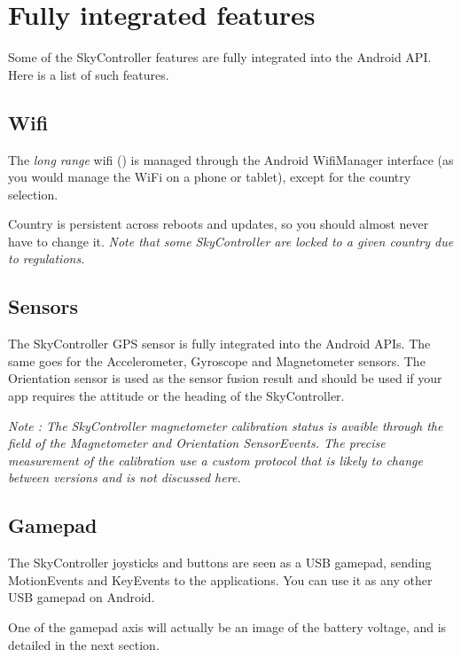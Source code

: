 \section{Fully integrated features}

Some of the SkyController features are fully integrated into the Android API. Here is a list of such features.

\subsection{Wifi}

The \emph{long range} wifi () is managed through the Android WifiManager interface (as you would manage the WiFi on a phone or tablet), except for the country selection.

Country is persistent across reboots and updates, so you should almost never have to change it. \emph{Note that some SkyController are locked to a given country due to regulations.}

\subsection{Sensors}

The SkyController GPS sensor is fully integrated into the Android APIs. The same goes for the Accelerometer, Gyroscope and Magnetometer sensors. The Orientation sensor is used as the sensor fusion result and should be used if your app requires the attitude or the heading of the SkyController.

\emph{Note : The SkyController magnetometer calibration status is avaible through the  field of the Magnetometer and Orientation SensorEvents. The precise measurement of the calibration use a custom protocol that is likely to change between versions and is not discussed here.}

\subsection{Gamepad}

The SkyController joysticks and buttons are seen as a USB gamepad, sending MotionEvents and KeyEvents to the applications. You can use it as any other USB gamepad on Android.

One of the gamepad axis will actually be an image of the battery voltage, and is detailed in the next section.

